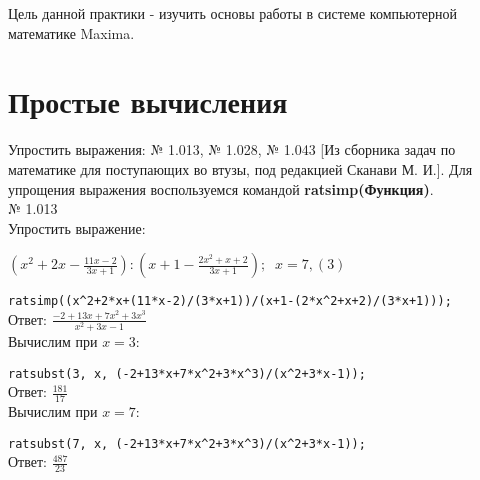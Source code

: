 \documentclass[article, bachelor, och, pract]{SCWorks}
\begin{document}
\worktitle{}





\chname{}  







\MakeTitle

\setcounter{tocdepth}{1}

\tableofcontents
\intro


Цель данной практики - изучить основы работы в системе компьютерной математике Maxima. 


\section{Простые вычисления}
Упростить выражения: № 1.013, № 1.028, № 1.043 [Из сборника задач по математике для поступающих во втузы, под редакцией Сканави М. И.]. Для упрощения выражения воспользуемся командой \textbf{ratsimp(Функция)}.
\\

№ 1.013\\
Упростить выражение:

$(x^2+2x-\frac{11x-2}{3x+1}):(x+1-\frac{2x^2+x+2}{3x+1}); \; \; x=7,(3)$

\texttt{ratsimp((x\^{}2+2*x+(11*x-2)/(3*x+1))/(x+1-(2*x\^{}2+x+2)/(3*x+1)));}\\
Ответ: $\frac{-2+13x+7x^2+3x^3}{x^2+3x-1}$
\\
Вычислим при $x = 3:$

\texttt{ratsubst(3, x, (-2+13*x+7*x\^{}2+3*x\^{}3)/(x\^{}2+3*x-1));}\\
Ответ: $\frac{181}{17}$
\\
Вычислим при $x = 7:$

\texttt{ratsubst(7, x, (-2+13*x+7*x\^{}2+3*x\^{}3)/(x\^{}2+3*x-1));}\\
Ответ: $\frac{487}{23}$
\\
\end{document}
